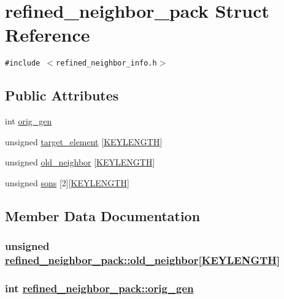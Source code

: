 \hypertarget{structrefined__neighbor__pack}{
\section{refined\_\-neighbor\_\-pack Struct Reference}
\label{structrefined__neighbor__pack}
}
{\tt \#include $<$refined\_\-neighbor\_\-info.h$>$}

\subsection*{Public Attributes}
\begin{CompactItemize}
\item 
int \hyperlink{structrefined__neighbor__pack_o0}{orig\_\-gen}
\item 
unsigned \hyperlink{structrefined__neighbor__pack_o1}{target\_\-element} \mbox{[}\hyperlink{constant_8h_a10}{KEYLENGTH}\mbox{]}
\item 
unsigned \hyperlink{structrefined__neighbor__pack_o2}{old\_\-neighbor} \mbox{[}\hyperlink{constant_8h_a10}{KEYLENGTH}\mbox{]}
\item 
unsigned \hyperlink{structrefined__neighbor__pack_o3}{sons} \mbox{[}2\mbox{]}\mbox{[}\hyperlink{constant_8h_a10}{KEYLENGTH}\mbox{]}
\end{CompactItemize}


\subsection{Member Data Documentation}
\hypertarget{structrefined__neighbor__pack_o2}{
\subsubsection[old\_\-neighbor]{\setlength{\rightskip}{0pt plus 5cm}unsigned \hyperlink{structrefined__neighbor__pack_o2}{refined\_\-neighbor\_\-pack::old\_\-neighbor}\mbox{[}\hyperlink{constant_8h_a10}{KEYLENGTH}\mbox{]}}}
\label{structrefined__neighbor__pack_o2}


\hypertarget{structrefined__neighbor__pack_o0}{
\subsubsection[orig\_\-gen]{\setlength{\rightskip}{0pt plus 5cm}int \hyperlink{structrefined__neighbor__pack_o0}{refined\_\-neighbor\_\-pack::orig\_\-gen}}}
\label{structrefined__neighbor__pack_o0}


